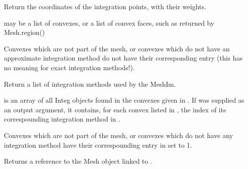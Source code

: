\documentclass[a4paper,11pt,english]{sphinxmanual}
\begin{document}
\begin{fulllineitems}
\begin{fulllineitems}
\label{\detokenize{python/cmdref_MeshIm:getfem.MeshIm.im_nodes}}
Return the coordinates of the integration points, with their weights.

 may be a list of convexes, or a list of convex faces, such
as returned by Mesh.region()


Convexes which are not part of the mesh, or convexes which
do not have an approximate integration method do not have
their corresponding entry (this has no meaning for exact
integration methods!).

\end{fulllineitems}


\begin{fulllineitems}
\label{\detokenize{python/cmdref_MeshIm:getfem.MeshIm.integ}}
Return a list of integration methods used by the MeshIm.

 is an array of all Integ objects found in the convexes
given in . If  was supplied as an output argument, it
contains, for each convex listed in , the index of its
correspounding integration method in .

Convexes which are not part of the mesh, or convexes which do
not have any integration method have their correspounding entry
in  set to \sphinxhyphen{}1.

\end{fulllineitems}


\begin{fulllineitems}
\label{\detokenize{python/cmdref_MeshIm:getfem.MeshIm.linked_mesh}}
Returns a reference to the Mesh object linked to .

\end{fulllineitems}


\end{fulllineitems}
\end{document}

